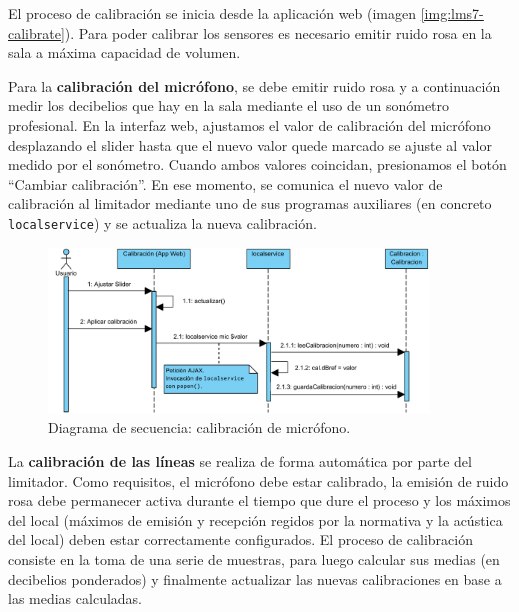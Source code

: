 El proceso de calibración se inicia desde la aplicación web (imagen \ref{img:lms7-calibrate}). Para poder calibrar los sensores es necesario emitir ruido rosa en la sala a máxima capacidad de volumen.

Para la \textbf{calibración del micrófono}, se debe emitir ruido rosa y a continuación medir los decibelios que hay en la sala mediante el uso de un sonómetro profesional. En la interfaz web, ajustamos el valor de calibración del micrófono desplazando el slider hasta que el nuevo valor quede marcado se ajuste al valor medido por el sonómetro. Cuando ambos valores coincidan, presionamos el botón ``Cambiar calibración''. En ese momento, se comunica el nuevo valor de calibración al limitador mediante uno de sus programas auxiliares (en concreto \verb|localservice|) y se actualiza la nueva calibración.

\begin{figure}[h]
    \centering
    \includegraphics[width=0.9\textwidth]{figuras/lms7-calibrate-mic.pdf}
    \caption{Diagrama de secuencia: calibración de micrófono.}
    \label{fig:lms7-calibrate-mic}
\end{figure}

La \textbf{calibración de las líneas} se realiza de forma automática por parte del limitador. Como requisitos, el micrófono debe estar calibrado, la emisión de ruido rosa debe permanecer activa durante el tiempo que dure el proceso y los máximos del local (máximos de emisión y recepción regidos por la normativa y la acústica del local) deben estar correctamente configurados. \newline
El proceso de calibración consiste en la toma de una serie de muestras, para luego calcular sus medias (en decibelios ponderados) y finalmente actualizar las nuevas calibraciones en base a las medias calculadas.

